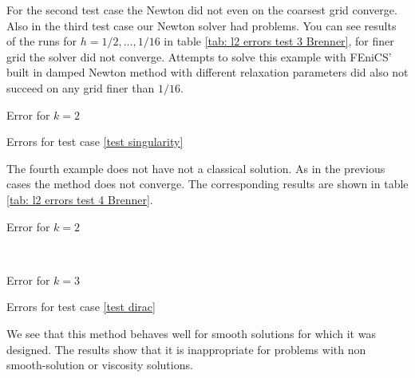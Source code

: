 For the second test case the Newton did not even on the coarsest grid converge. Also in the third test case our Newton solver had problems. You can see results of the runs for $h=1/2, \dots, 1/16$ in table \ref{tab: l2 errors test 3 Brenner}, for finer grid the solver did not converge. Attempts to solve this example with FEniCS' built in damped Newton method with different relaxation parameters did also not succeed on any grid finer than $1/16$.
\begin{table}[h]
		\centering
		\pgfplotstabletypeset[columns={iterations, l2error, h1error,N},
				    every row 0 column 0/.style={set content=init},
		]\MAThreeBrennerTwo
    	\caption{Error for $k=2$}
	\caption{Errors for test case \ref{test singularity}}
	\label{tab: l2 errors test 3 Brenner}
\end{table}

The fourth example does not have not a classical solution. As in the previous cases the method does not converge. The corresponding results are shown in table \ref{tab: l2 errors test 4 Brenner}.

\begin{table}[H]
	\begin{subtable}[b]{0.45\textwidth}
		\centering
		\pgfplotstabletypeset[columns={iterations, l2error, h1error,N},
				    every row 0 column 0/.style={set content=init},
				    columns/l2error/.style={ /pgf/number format/sci precision=6}     %
		]\MAFourBrennerTwo
    	\caption{Error for $k=2$}
   \end{subtable}
   ~
	\begin{subtable}[b]{0.45\textwidth}
		\centering
		\pgfplotstabletypeset[columns={iterations, l2error, h1error,N},
				    every row 0 column 0/.style={set content=init},
				    columns/l2error/.style={ /pgf/number format/sci precision=6}     %
		]\MAFourBrennerThree
 	\caption{Error for $k=3$}
	\end{subtable}
	\caption{Errors for test case \ref{test dirac}}
	\label{tab: l2 errors test 4 Brenner}
\end{table}


We see that this method behaves well for smooth solutions for which it was designed. The results show that it is inappropriate for problems with non smooth-solution or viscosity solutions.

